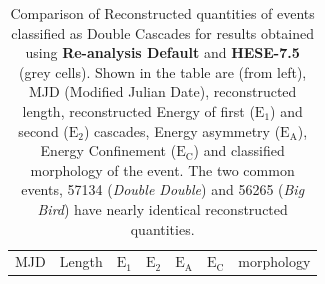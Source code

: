 \begin{table}[h!]
    \caption{Comparison of Reconstructed quantities of events classified as Double Cascades for results obtained using \textbf{Re-analysis Default} and \textbf{HESE-7.5} (grey cells). Shown in the table are (from left), MJD (Modified Julian Date), reconstructed length, reconstructed Energy of first ($\mathrm{E}_1$) and second ($\mathrm{E}_2$) cascades, Energy asymmetry ($\mathrm{E}_\mathrm{A}$), Energy Confinement ($\mathrm{E}_\mathrm{C}$) and classified morphology of the event. The two common events, 57134 (\emph{Double Double}) and 56265 (\emph{Big Bird}) have nearly identical reconstructed quantities.}
    \begin{tabular}{c|cc|cc|cc|cc|cc|cc}
        \toprule
         MJD    & \multicolumn{2}{c|}{Length}
                
                        & \multicolumn{2}{c|}{$\mathrm{E}_\mathrm{1}$}
                                & \multicolumn{2}{c|}{$\mathrm{E}_\mathrm{2}$} 
                                    & \multicolumn{2}{c|}{$\mathrm{E}_\mathrm{A}$} 
                                        & \multicolumn{2}{c|}{$\mathrm{E}_\mathrm{C}$}  
                                            & \multicolumn{2}{c}{morphology}                \\
                       

\end{tabular}
\end{table}
